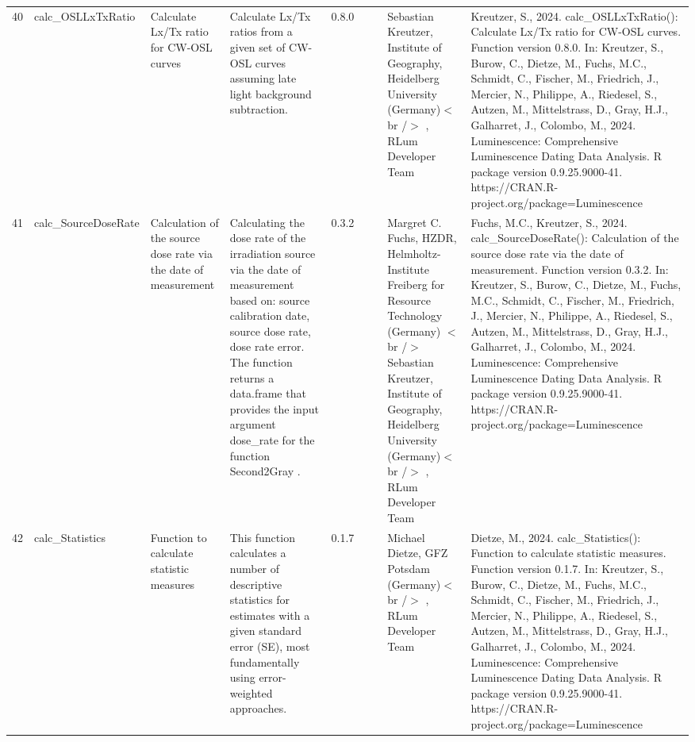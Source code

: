 \begin{table}[ht]
\begin{tabular}{rllllllll}
 \\ 
  40 & calc\_OSLLxTxRatio & Calculate  Lx/Tx  ratio for CW-OSL curves & Calculate  Lx/Tx  ratios from a given set of CW-OSL curves assuming late light background subtraction. & 0.8.0
 &  &  & Sebastian Kreutzer, Institute of Geography, Heidelberg University (Germany)$<$br /$>$ , RLum Developer Team & Kreutzer, S., 2024. calc\_OSLLxTxRatio(): Calculate Lx/Tx ratio for CW-OSL curves. Function version 0.8.0. In: Kreutzer, S., Burow, C., Dietze, M., Fuchs, M.C., Schmidt, C., Fischer, M., Friedrich, J., Mercier, N., Philippe, A., Riedesel, S., Autzen, M., Mittelstrass, D., Gray, H.J., Galharret, J., Colombo, M., 2024. Luminescence: Comprehensive Luminescence Dating Data Analysis. R package version 0.9.25.9000-41. https://CRAN.R-project.org/package=Luminescence
 \\ 
  41 & calc\_SourceDoseRate & Calculation of the source dose rate via the date of measurement & Calculating the dose rate of the irradiation source via the date of measurement based on: source calibration date, source dose rate, dose rate error. The function returns a data.frame that provides the input argument dose\_rate for the function  Second2Gray . & 0.3.2
 &  &  & Margret C. Fuchs, HZDR, Helmholtz-Institute Freiberg for Resource Technology (Germany)  $<$br /$>$ Sebastian Kreutzer, Institute of Geography, Heidelberg University (Germany)$<$br /$>$ , RLum Developer Team & Fuchs, M.C., Kreutzer, S., 2024. calc\_SourceDoseRate(): Calculation of the source dose rate via the date of measurement. Function version 0.3.2. In: Kreutzer, S., Burow, C., Dietze, M., Fuchs, M.C., Schmidt, C., Fischer, M., Friedrich, J., Mercier, N., Philippe, A., Riedesel, S., Autzen, M., Mittelstrass, D., Gray, H.J., Galharret, J., Colombo, M., 2024. Luminescence: Comprehensive Luminescence Dating Data Analysis. R package version 0.9.25.9000-41. https://CRAN.R-project.org/package=Luminescence
 \\ 
  42 & calc\_Statistics & Function to calculate statistic measures & This function calculates a number of descriptive statistics for estimates with a given standard error (SE), most fundamentally using error-weighted approaches. & 0.1.7
 &  &  & Michael Dietze, GFZ Potsdam (Germany)$<$br /$>$ , RLum Developer Team & Dietze, M., 2024. calc\_Statistics(): Function to calculate statistic measures. Function version 0.1.7. In: Kreutzer, S., Burow, C., Dietze, M., Fuchs, M.C., Schmidt, C., Fischer, M., Friedrich, J., Mercier, N., Philippe, A., Riedesel, S., Autzen, M., Mittelstrass, D., Gray, H.J., Galharret, J., Colombo, M., 2024. Luminescence: Comprehensive Luminescence Dating Data Analysis. R package version 0.9.25.9000-41. https://CRAN.R-project.org/package=Luminescence

\end{tabular}
\end{table}

